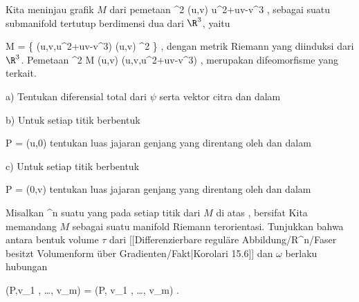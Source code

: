 {}
{

Kita meninjau grafik $M$ dari pemetaan
\maabbeledisp {\varphi} {\R^2} {\R
} {(u,v)} { u^2+uv-v^3
} {,} sebagai suatu submanifold tertutup berdimensi dua dari $\R^3$, yaitu

\mavergleichskettedisp
{\vergleichskette
{ M
}
{ =} { \left\{ (u,v,u^2+uv-v^3)  \mid  (u,v) \in \R^2         \right\}
}
{ } {
}
{ } {
}
{ } {
}
}
{}{}{,}
dengan metrik Riemann yang diinduksi dari $\R^3$. Pemetaan
\maabbeledisp {\psi} {\R^2} { M
} {(u,v)} { (u,v,u^2+uv-v^3)
} {,}
merupakan difeomorfisme yang terkait.

a) Tentukan diferensial total dari $\psi$ serta vektor citra
 dan
 dalam

b) Untuk setiap titik berbentuk

\mavergleichskette
{\vergleichskette
{ P
}
{ = }{ (u,0)
}
{  }{
}
{    }{
}
{   }{
}
}
{}{}{}
tentukan luas jajaran genjang yang direntang oleh
 dan
 dalam

c) Untuk setiap titik berbentuk

\mavergleichskette
{\vergleichskette
{ P
}
{ = }{ (0,v)
}
{  }{
}
{    }{
}
{   }{
}
}
{}{}{}
tentukan luas jajaran genjang yang direntang oleh
 dan
 dalam

}
{} {}

{}
{

Misalkan
\maabbdisp {\varphi} {\R^n } {\R
} {}
 {} {}
suatu
yang pada setiap titik dari
$M$ di atas
\mathl{0 \in \R}{}, bersifat
Kita memandang $M$ sebagai suatu manifold Riemann terorientasi. Tunjukkan bahwa antara bentuk volume $\tau$ dari
[[Differenzierbare reguläre Abbildung/R^n/Faser besitzt Volumenform über Gradienten/Fakt|Korolari 15.6]]
dan
$\omega$ berlaku hubungan

\mavergleichskettedisp
{\vergleichskette
{\tau(P,v_1 , \ldots , v_m)
}
{ =} { \pm {} \Vert  \omega(P, v_1 , \ldots , v_m)
}
{ } {
}
{ } {
}
{ } {
}
}
{}{}{.}

}
{} {}


